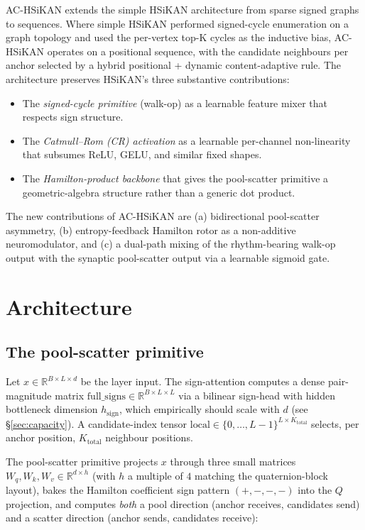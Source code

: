 \documentclass[10pt,a4paper]{article}
\begin{document}
AC-HSiKAN extends the simple HSiKAN architecture from sparse signed
graphs to sequences. Where simple HSiKAN performed signed-cycle
enumeration on a graph topology and used the per-vertex top-K cycles
as the inductive bias, AC-HSiKAN operates on a positional sequence,
with the candidate neighbours per anchor selected by a hybrid
positional + dynamic content-adaptive rule. The architecture preserves
HSiKAN's three substantive contributions:

\begin{itemize}[noitemsep]
\item The \emph{signed-cycle primitive} (walk-op) as a learnable feature
      mixer that respects sign structure.
\item The \emph{Catmull--Rom (CR) activation} as a learnable per-channel
      non-linearity that subsumes ReLU, GELU, and similar fixed shapes.
\item The \emph{Hamilton-product backbone} that gives the pool-scatter
      primitive a geometric-algebra structure rather than a generic dot
      product.
\end{itemize}

The new contributions of AC-HSiKAN are (a) bidirectional pool-scatter
asymmetry, (b) entropy-feedback Hamilton rotor as a non-additive
neuromodulator, and (c) a dual-path mixing of the rhythm-bearing
walk-op output with the synaptic pool-scatter output via a learnable
sigmoid gate.

\section{Architecture}

\subsection{The pool-scatter primitive}

Let $x \in \mathbb{R}^{B \times L \times d}$ be the layer input. The
sign-attention computes a dense pair-magnitude matrix
$\mathrm{full\_signs} \in \mathbb{R}^{B \times L \times L}$ via a
bilinear sign-head with hidden bottleneck dimension $h_{\text{sign}}$,
which empirically should scale with $d$ (see \S\ref{sec:capacity}).
A candidate-index tensor $\mathrm{local} \in \{0, \dots, L-1\}^{L \times K_{\text{total}}}$
selects, per anchor position, $K_{\text{total}}$ neighbour positions.

The pool-scatter primitive projects $x$ through three small matrices
$W_q, W_k, W_v \in \mathbb{R}^{d \times h}$ (with $h$ a multiple of $4$
matching the quaternion-block layout), bakes the Hamilton coefficient
sign pattern $(+, -, -, -)$ into the $Q$ projection, and computes
\emph{both} a pool direction (anchor receives, candidates send) and a
scatter direction (anchor sends, candidates receive):
\end{document}
